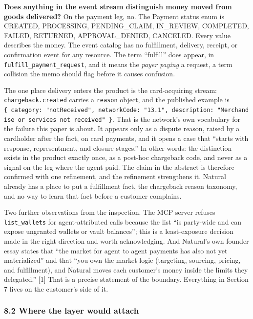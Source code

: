 \documentclass[
  11pt,
  letterpaper,
]{article}
\begin{document}
\textbf{Does anything in the event stream distinguish money moved from
goods delivered?} On the payment leg, no. The Payment status enum is
CREATED, PROCESSING, PENDING\_CLAIM, IN\_REVIEW, COMPLETED, FAILED,
RETURNED, APPROVAL\_DENIED, CANCELED. Every value describes the money.
The event catalog has no fulfillment, delivery, receipt, or confirmation
event for any resource. The term ``fulfill'' does appear, in
\texttt{fulfill\_payment\_request}, and it means the \emph{payer paying}
a request, a term collision the memo should flag before it causes
confusion.

The one place delivery enters the product is the card-acquiring stream:
\texttt{chargeback.created} carries a \texttt{reason} object, and the
published example is
\texttt{\{\ category:\ "notReceived",\ networkCode:\ "13.1",\ description:\ "Merchandise\ or\ services\ not\ received"\ \}}.
That is the network's own vocabulary for the failure this paper is
about. It appears only as a dispute reason, raised by a cardholder after
the fact, on card payments, and it opens a case that ``starts with
response, representment, and closure stages.'' In other words: the
distinction exists in the product exactly once, as a post-hoc chargeback
code, and never as a signal on the leg where the agent paid. The claim
in the abstract is therefore confirmed with one refinement, and the
refinement strengthens it. Natural already has a place to put a
fulfillment fact, the chargeback reason taxonomy, and no way to learn
that fact before a customer complains.

Two further observations from the inspection. The MCP server refuses
\texttt{list\_wallets} for agent-attributed calls because the list ``is
party-wide and can expose ungranted wallets or vault balances''; this is
a least-exposure decision made in the right direction and worth
acknowledging. And Natural's own founder essay states that ``the market
for agent to agent payments has also not yet materialized'' and that
``you own the market logic (targeting, sourcing, pricing, and
fulfillment), and Natural moves each customer's money inside the limits
they delegated.'' {[}1{]} That is a precise statement of the boundary.
Everything in Section 7 lives on the customer's side of it.

\subsubsection{8.2 Where the layer would
attach}\label{where-the-layer-would-attach}
\end{document}
